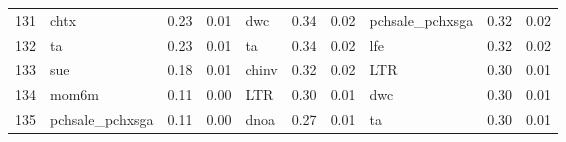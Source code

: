 \documentclass[12pt]{article}
\begin{document}
\begin{landscape}
\begin{footnotesize}
\begin{longtable}{l|lcc|lcc|lcc}
			131                   & chtx                        & 0.23                                                                                 & 0.01                            & dwc                         & 0.34                                                                                 & 0.02                            & pchsale\_pchxsga            & 0.32                                                                                 & 0.02                           \\
			132                   & ta                          & 0.23                                                                                 & 0.01                            & ta                          & 0.34                                                                                 & 0.02                            & lfe                         & 0.32                                                                                 & 0.02                           \\
			133                   & sue                         & 0.18                                                                                 & 0.01                            & chinv                       & 0.32                                                                                 & 0.02                            & LTR                         & 0.30                                                                                 & 0.01                           \\
			134                   & mom6m                       & 0.11                                                                                 & 0.00                            & LTR                         & 0.30                                                                                 & 0.01                            & dwc                         & 0.30                                                                                 & 0.01                           \\
			135                   & pchsale\_pchxsga            & 0.11                                                                                 & 0.00                            & dnoa                        & 0.27                                                                                 & 0.01                            & ta                          & 0.30                                                                                 & 0.01                           \\

\end{longtable}
\end{footnotesize}
\end{landscape}
\end{document}
